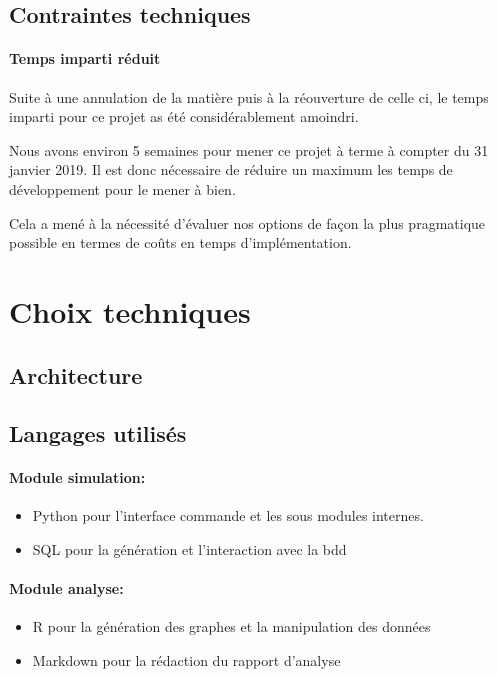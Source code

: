 			\subsection{Contraintes techniques}
				\paragraph{Temps imparti réduit}
				
				Suite à une annulation de la matière puis à la réouverture de celle ci, le temps imparti pour ce projet as été considérablement amoindri.
				
				Nous avons environ 5 semaines pour mener ce projet à terme à compter du 31 janvier 2019.
				Il est donc nécessaire de réduire un maximum les temps de développement pour le mener à bien.
				
				Cela a mené à la nécessité d'évaluer nos options de façon la plus pragmatique possible en termes de coûts en temps d'implémentation.
				
				
				
		
		\section{Choix techniques}
			\subsection{Architecture}
			
			\subsection{Langages utilisés}
			
			
				\paragraph{Module simulation:}
				\begin{itemize}
					\item Python pour l'interface commande et les sous modules internes.
					\item SQL pour la génération et l'interaction avec la bdd
				\end{itemize} 
				
				
				\paragraph{Module analyse:}
				\begin{itemize}
					\item R pour la génération des graphes et la manipulation des données
					\item Markdown pour la rédaction du rapport d'analyse
				\end{itemize}
			

